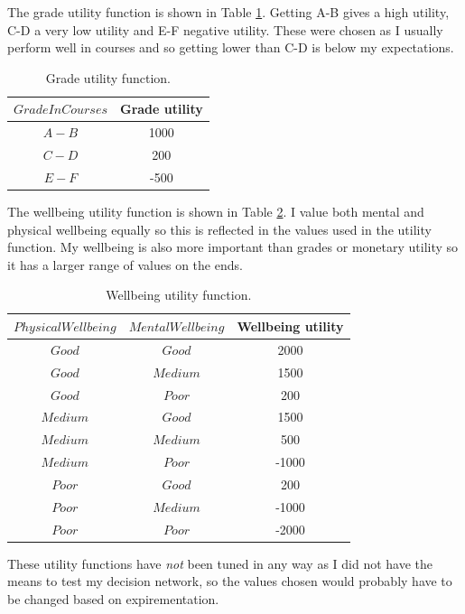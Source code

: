 \documentclass[11pt, a4paper, english]{../Template/NTNUoving}
\begin{document}
\begin{oppgave}
    The grade utility function is shown in Table \ref{tab:GU}. Getting A-B gives a high utility, C-D a very low utility and E-F negative utility.
    These were chosen as I usually perform well in courses and so getting lower than C-D is below my expectations.

    \begin{table}[H]
        \centering
        \begin{tabular}{|c|c|}
            \hline
            $GradeInCourses$ & Grade utility  \\
            \hline
            $A-B$ & 1000 \\ [1.0ex]
            $C-D$ & 200 \\ [1.0ex]
            $E-F$ & -500 \\ [1.0ex]
            \hline
        \end{tabular}
        \caption{Grade utility function.}
        \label{tab:GU}
    \end{table}

    The wellbeing utility function is shown in Table \ref{tab:WU}. I value both mental and physical wellbeing equally so this is reflected
    in the values used in the utility function. My wellbeing is also more important than grades or monetary utility so it has a larger range of values on the ends.

    \begin{table}[H]
        \centering
        \begin{tabular}{|c|c|c|}
            \hline
            $PhysicalWellbeing$ & $MentalWellbeing$ & Wellbeing utility  \\
            \hline
            $Good$ & $Good$ & 2000 \\ [1.0ex]
            $Good$ & $Medium$ & 1500 \\ [1.0ex]
            $Good$ & $Poor$ & 200 \\ [1.0ex]
            $Medium$ & $Good$ & 1500 \\ [1.0ex]
            $Medium$ & $Medium$ & 500 \\ [1.0ex]
            $Medium$ & $Poor$ & -1000 \\ [1.0ex]
            $Poor$ & $Good$ & 200 \\ [1.0ex]
            $Poor$ & $Medium$ & -1000 \\ [1.0ex]
            $Poor$ & $Poor$ & -2000 \\ [1.0ex]
            \hline
        \end{tabular}
        \caption{Wellbeing utility function.}
        \label{tab:WU}
    \end{table}

    These utility functions have \textit{not} been tuned in any way as I did not have the means to test my decision network, so the
    values chosen would probably have to be changed based on expirementation.




\end{oppgave}
\end{document}
